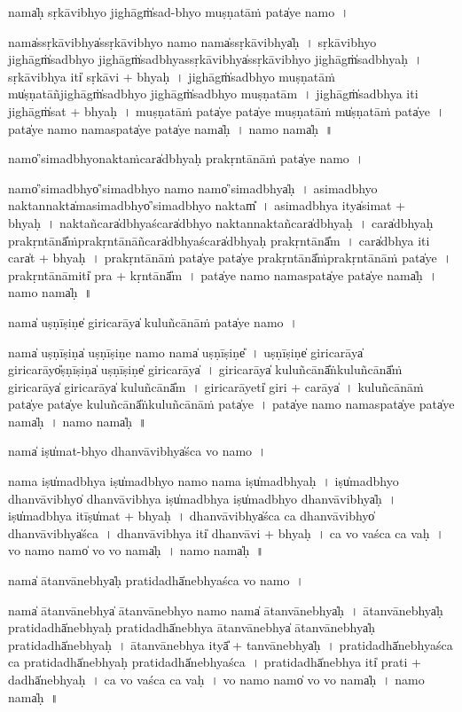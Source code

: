 \documentclass[parskip, DIV=14]{scrartcl}
\begin{document}
{nama̍ḥ sṛkā॒vibhyo॒ jighāgṁ̍sad-bhyo muṣṇa॒tāṁ pata̍ye॒ namo॒~।

nama̍ssṛkā॒vibhya̍ssṛkā॒vibhyo॒ namo॒ nama̍ssṛkā॒vibhya̍ḥ~।
sṛ॒kā॒vibhyo॒ jighāgṁ̍sadbhyo॒ jighāgṁ̍sadbhyassṛkā॒vibhya̍ssṛkā॒vibhyo॒ jighāgṁ̍sadbhyaḥ~।
sṛ॒kā॒vibhya॒ iti̍ sṛkā॒vi + bhya॒ḥ~।
jighāgṁ̍sadbhyo muṣṇa॒tāṁ mu̍ṣṇa॒tāñjighāgṁ̍sadbhyo॒ jighāgṁ̍sadbhyo muṣṇa॒tām~।
jighāgṁ̍sadbhya॒ iti॒  jighāgṁ̍sat + bhya॒ḥ~।
mu॒ṣṇa॒tāṁ pata̍ye॒ pata̍ye muṣṇa॒tāṁ mu̍ṣṇa॒tāṁ pata̍ye~।
pata̍ye॒ namo॒ nama॒spata̍ye॒ pata̍ye॒ nama̍ḥ~।
namo॒ nama̍ḥ~॥ 

namo̍'si॒madbhyo॒nakta॒ṁcara̍dbhyaḥ prakṛ॒ntānā॒ṁ pata̍ye॒ namo॒~।

namo̍'si॒madbhyo̍'si॒madbhyo॒ namo॒ namo̍'si॒madbhya̍ḥ~।
 a॒si॒madbhyo॒ nakta॒nnakta̍masi॒madbhyo̍'si॒madbhyo॒ naktam̎~।
 a॒si॒madbhya॒ itya̍si॒mat + bhya॒ḥ~।
 na॒kta॒ñcara̍dbhya॒ścara̍dbhyo॒ nakta॒nnakta॒ñcara̍dbhyaḥ~।
 cara̍dbhyaḥ prakṛ॒ntānā̎ṁprakṛ॒ntānā॒ñcara̍dbhya॒ścara̍dbhyaḥ prakṛ॒ntānā̎m~।
 cara̍dbhya॒ iti॒ cara̍t + bhya॒ḥ~।
 pra॒kṛ॒ntānā॒ṁ pata̍ye॒ pata̍ye prakṛ॒ntānā̎ṁprakṛ॒ntānā॒ṁ pata̍ye~।
 pra॒kṛ॒ntānā॒miti̍ pra + kṛ॒ntānā̎m~।
pata̍ye॒ namo॒ nama॒spata̍ye॒ pata̍ye॒ nama̍ḥ~।
namo॒ nama̍ḥ~॥ 

nama̍ uṣṇī॒ṣiṇe̍ girica॒rāya̍ kulu॒ñcānā॒ṁ pata̍ye॒ namo॒~। 

nama̍ uṣṇī॒ṣiṇa̍ uṣṇī॒ṣiṇe॒ namo॒ nama̍ uṣṇī॒ṣiṇe̎~। 
u॒ṣṇī॒ṣiṇe̍ girica॒rāya̍ girica॒rāyo̎ṣṇī॒ṣiṇa̍ uṣṇī॒ṣiṇe̍ girica॒rāya̍~। 
gi॒ri॒ca॒rāya̍ kulu॒ñcānā̎ṅkulu॒ñcānā̎ṁ girica॒rāya̍ girica॒rāya̍ kulu॒ñcānā̎m~। 
gi॒ri॒ca॒rāyeti̍ giri + ca॒rāya̍~। 
ku॒lu॒ñcānā॒ṁ pata̍ye॒ pata̍ye kulu॒ñcānā̎ṅkulu॒ñcānā॒ṁ pata̍ye~। 
pata̍ye॒ namo॒ nama॒spata̍ye॒ pata̍ye॒ nama̍ḥ~।
namo॒ nama̍ḥ~॥ 

nama̍ iṣu̍mat-bhyo dhanvā॒vibhya̍śca vo॒ namo~।

nama॒ iṣu̍madbhya॒ iṣu̍madbhyo॒ namo॒ nama॒ iṣu̍madbhyaḥ~।
iṣu̍madbhyo dhanvā॒vibhyo̍ dhanvā॒vibhya॒ iṣu̍madbhya॒ iṣu̍madbhyo dhanvā॒vibhya̍ḥ~।
iṣu̍madbhya॒ itīṣu̍mat + bhya॒ḥ~।
dha॒nvā॒vibhya̍śca ca dhanvā॒vibhyo̍ dhanvā॒vibhya̍śca~।
dha॒nvā॒vibhya॒ iti̍ dhanvā॒vi + bhya॒ḥ~।
ca॒ vo॒ va॒śca॒ ca॒ va॒ḥ~।
vo॒ namo॒ namo̍ vo vo॒ nama̍ḥ~।
namo॒ nama̍ḥ~॥ 


nama̍ ātanvā॒nebhya̍ḥ prati॒dadhā̍nebhyaśca vo॒ namo~।

nama̍ ātanvā॒nebhya̍ ātanvā॒nebhyo॒ namo॒ nama̍ ātanvā॒nebhya̍ḥ~।
ā॒ta॒nvā॒nebhya̍ḥ prati॒dadhā̍nebhyaḥ prati॒dadhā̍nebhya ātanvā॒nebhya̍ ātanvā॒nebhya̍ḥ prati॒dadhā̍nebhyaḥ~।
ā॒ta॒nvā॒nebhya॒ ityā̎ + ta॒nvā॒nebhya̍ḥ~।
pra॒ti॒dadhā̍nebhyaśca ca prati॒dadhā̍nebhyaḥ prati॒dadhā̍nebhyaśca~।
pra॒ti॒dadhā̍nebhya॒ iti̍ prati + dadhā̍nebhyaḥ~।
ca॒ vo॒ va॒śca॒ ca॒ va॒ḥ~।
vo॒ namo॒ namo̍ vo vo॒ nama̍ḥ~।
namo॒ nama̍ḥ~॥ 


}
\end{document}
